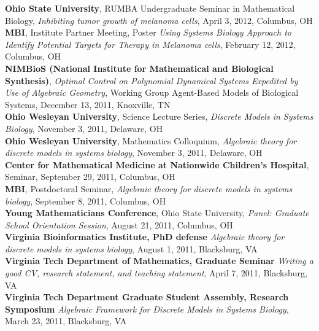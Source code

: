\documentclass[10pt]{article}
\begin{document}
  \textbf{Ohio State University}, RUMBA Undergraduate Seminar in Mathematical Biology, {\it Inhibiting tumor growth of melanoma cells}, April 3, 2012, Columbus, OH\\

  \textbf{MBI}, Institute Partner Meeting, Poster {\it Using Systems Biology Approach to Identify Potential Targets for Therapy in Melanoma cells}, February 12, 2012, Columbus, OH\\

  \textbf{NIMBioS (National Institute for Mathematical and Biological Synthesis)}, {\it Optimal Control on Polynomial Dynamical Systems Expedited by Use of Algebraic Geometry}, Working Group Agent-Based Models of Biological Systems, December 13, 2011, Knoxville, TN\\

  \textbf{Ohio Wesleyan University}, Science Lecture Series, {\it Discrete Models in Systems Biology}, November 3, 2011, Delaware, OH\\

  \textbf{Ohio Wesleyan University}, Mathematics Colloquium, {\it Algebraic theory for discrete models in systems biology}, November 3, 2011, Delaware, OH\\

  \textbf{Center for Mathematical Medicine at Nationwide Children's Hospital}, Seminar, September 29, 2011, Columbus, OH\\

  \textbf{MBI}, Postdoctoral Seminar, {\it Algebraic theory for discrete models in systems biology}, September 8, 2011, Columbus, OH\\

  \textbf{Young Mathematicians Conference}, Ohio State University, {\it Panel: Graduate School Orientation Session}, August 21, 2011, Columbus, OH\\

  \textbf{Virginia Bioinformatics Institute, PhD defense}
  \textit{Algebraic theory for discrete models in systems biology}, August 1, 2011, Blacksburg, VA\\

  \textbf{Virginia Tech Department of Mathematics, Graduate Seminar}
  \textit{Writing a good CV, research statement, and teaching statement}, April
  7, 2011, Blacksburg, VA\\

  \textbf{Virginia Tech Department Graduate Student Assembly, Research
  Symposium}
  \textit{Algebraic Framework for Discrete Models in Systems Biology}, March
  23, 2011, Blacksburg, VA\\
\end{document}
